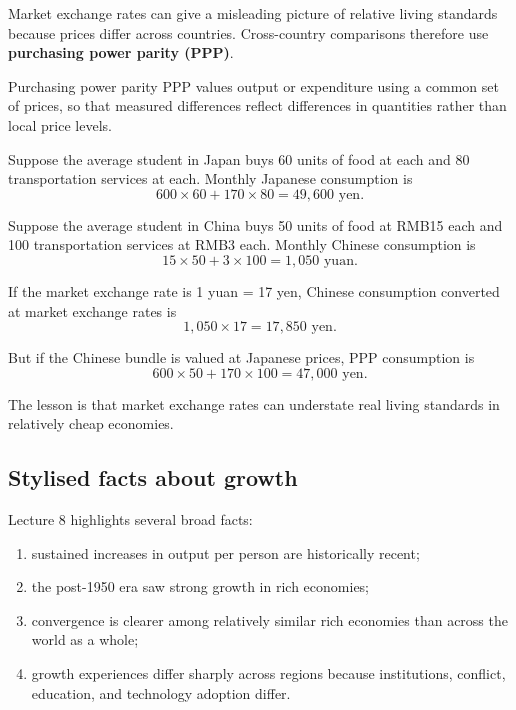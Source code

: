 \documentclass[12pt]{article}
\begin{document}
Market exchange rates can give a misleading picture of relative living standards because prices differ across countries. Cross-country comparisons therefore use \textbf{purchasing power parity (PPP)}.

\begin{definition}{Purchasing power parity}{}
PPP values output or expenditure using a common set of prices, so that measured differences reflect differences in quantities rather than local price levels.
\end{definition}

\begin{examplebox}[title={Worked Example: Exchange-rate comparison versus PPP}]
Suppose the average student in Japan buys 60 units of food at  each and 80 transportation services at  each. Monthly Japanese consumption is
\[
600\times 60 + 170\times 80 = 49{,}600 \text{ yen}.
\]

Suppose the average student in China buys 50 units of food at RMB15 each and 100 transportation services at RMB3 each. Monthly Chinese consumption is
\[
15\times 50 + 3\times 100 = 1{,}050 \text{ yuan}.
\]

If the market exchange rate is 1 yuan = 17 yen, Chinese consumption converted at market exchange rates is
\[
1{,}050\times 17 = 17{,}850 \text{ yen}.
\]

But if the Chinese bundle is valued at Japanese prices, PPP consumption is
\[
600\times 50 + 170\times 100 = 47{,}000 \text{ yen}.
\]

The lesson is that market exchange rates can understate real living standards in relatively cheap economies.
\end{examplebox}

\subsection{Stylised facts about growth}

Lecture 8 highlights several broad facts:
\begin{enumerate}[leftmargin=1.5em]
\item sustained increases in output per person are historically recent;
\item the post-1950 era saw strong growth in rich economies;
\item convergence is clearer among relatively similar rich economies than across the world as a whole;
\item growth experiences differ sharply across regions because institutions, conflict, education, and technology adoption differ.
\end{enumerate}
\end{document}
